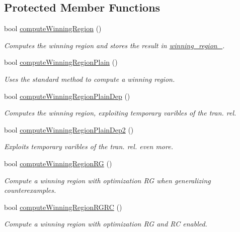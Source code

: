 \subsection*{Protected Member Functions}
\begin{DoxyCompactItemize}
\item 
bool \hyperlink{classLearnSynthSAT_a055b4699184d09bb7f6b15052ac684db}{compute\-Winning\-Region} ()
\begin{DoxyCompactList}\small\item\em Computes the winning region and stores the result in \hyperlink{classLearnSynthSAT_aced2bce789c7a93ed4b5391dd0690616}{winning\-\_\-region\-\_\-}. \end{DoxyCompactList}\item 
bool \hyperlink{classLearnSynthSAT_a49541a9cff8002ca31e0044ae35546a2}{compute\-Winning\-Region\-Plain} ()
\begin{DoxyCompactList}\small\item\em Uses the standard method to compute a winning region. \end{DoxyCompactList}\item 
bool \hyperlink{classLearnSynthSAT_a0d36fdd8180e9ba06e116b6ed3cb6a72}{compute\-Winning\-Region\-Plain\-Dep} ()
\begin{DoxyCompactList}\small\item\em Computes the winning region, exploiting temporary varibles of the tran. rel. \end{DoxyCompactList}\item 
bool \hyperlink{classLearnSynthSAT_a7190dabde3f24ddb94c0484f7df3b026}{compute\-Winning\-Region\-Plain\-Dep2} ()
\begin{DoxyCompactList}\small\item\em Exploits temporary varibles of the tran. rel. even more. \end{DoxyCompactList}\item 
bool \hyperlink{classLearnSynthSAT_aa981048565f10183c30c4dc0576de6b6}{compute\-Winning\-Region\-R\-G} ()
\begin{DoxyCompactList}\small\item\em Compute a winning region with optimization R\-G when generalizing counterexamples. \end{DoxyCompactList}\item 
bool \hyperlink{classLearnSynthSAT_a2d54b84ce5e87b7b2d398226faa501b0}{compute\-Winning\-Region\-R\-G\-R\-C} ()
\begin{DoxyCompactList}\small\item\em Compute a winning region with optimization R\-G and R\-C enabled. \end{DoxyCompactList}\item 

\end{DoxyCompactItemize}
